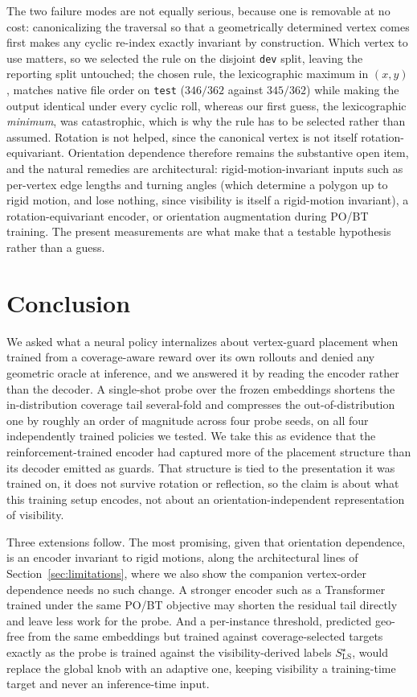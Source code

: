 \documentclass[11pt]{article}
\begin{document}
\begin{enumerate}
The two failure modes are not equally serious, because one is removable at no cost: canonicalizing the traversal so that a geometrically determined vertex comes first makes any cyclic re-index exactly invariant by construction. Which vertex to use matters, so we selected the rule on the disjoint \texttt{dev} split, leaving the reporting split untouched; the chosen rule, the  lexicographic maximum in $(x, y)$, matches native file order on \texttt{test} ($346/362$ against $345/362$) while making the output identical under every cyclic roll, whereas our first guess, the lexicographic \emph{minimum}, was catastrophic, which is why the rule has to be selected rather than assumed. Rotation is not helped, since the canonical vertex is not itself rotation-equivariant. Orientation dependence therefore remains the substantive open item, and the natural remedies are architectural: rigid-motion-invariant inputs such as per-vertex edge lengths and turning angles (which determine a polygon up to rigid motion, and lose nothing, since visibility is itself a rigid-motion invariant), a rotation-equivariant encoder, or orientation augmentation during PO/BT training. The present measurements are what make that a testable hypothesis rather than a guess.
\end{enumerate}

\section{Conclusion}
\label{sec:conclusion}

We asked what a neural policy internalizes about vertex-guard placement when trained from a coverage-aware reward over its own rollouts and denied any geometric oracle at inference, and we answered it by reading the encoder rather than the decoder. A single-shot probe over the frozen embeddings shortens the in-distribution coverage tail several-fold and compresses the out-of-distribution one by roughly an order of magnitude across four probe seeds, on all four independently trained policies we tested. We take this as evidence that the reinforcement-trained encoder had captured more of the placement structure than its decoder emitted as guards. That structure is tied to the presentation it was trained on, it does not survive rotation or reflection, so the claim is about what this training setup encodes, not about an orientation-independent representation of visibility.

Three extensions follow. The most promising, given that orientation dependence, is an encoder invariant to rigid motions, along the architectural lines of Section~\ref{sec:limitations}, where we also show the companion vertex-order dependence needs no such change. A stronger encoder such as a Transformer trained under the same PO/BT objective may shorten the residual tail directly and leave less work for the probe. And a per-instance threshold, predicted geo-free from the same embeddings but trained against coverage-selected targets exactly as the probe is trained against the visibility-derived labels $S^\star_{\mathrm{LS}}$, would replace the global knob with an adaptive one, keeping visibility a training-time target and never an inference-time input.
\end{document}
